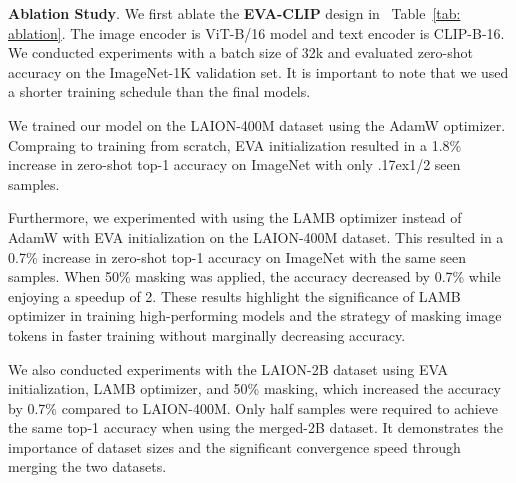 \documentclass[10pt,twocolumn,letterpaper]{article}
\newcommand{\evablue}[1]{\textcolor{00blue!80}{#1}}
\renewcommand{\paragraph}[1]{\vspace{1.25mm}\noindent\textbf{#1}}
\newcommand{\app}{\raise.17ex\hbox{}}
\newcommand{\tblref}[1]{Table~\ref{#1}}
\newcommand{\evaclip}{{\textbf{\evablue{EVA-CLIP}}}\xspace}
\begin{document}
\paragraph{Ablation Study}. We first ablate the \evaclip design in ~\tblref{tab: ablation}. The image encoder is ViT-B/16\cite{vit} model and text encoder is CLIP-B-16. We conducted experiments with a batch size of 32k and evaluated zero-shot accuracy on the ImageNet-1K validation set. It is important to note that we used a shorter training schedule than the final models.

We trained our model on the LAION-400M\cite{laion400m} dataset using the AdamW\cite{Loshchilov2019adamw} optimizer. Compraing to training from scratch, EVA initialization resulted in a 1.8\% increase in zero-shot top-1 accuracy on ImageNet with only \app1/2 seen samples.

Furthermore, we experimented with using the LAMB optimizer instead of AdamW with EVA initialization on the LAION-400M dataset. This resulted in a 0.7\% increase in zero-shot top-1 accuracy on ImageNet with the same seen samples. When 50\% masking was applied, the accuracy decreased by 0.7\% while enjoying a speedup of 2. These results highlight the significance of LAMB optimizer in training high-performing models and the strategy of masking image tokens in faster training without marginally decreasing accuracy.

 We also conducted experiments with the LAION-2B dataset using EVA initialization, LAMB optimizer, and 50\% masking, which increased the accuracy by 0.7\% compared to LAION-400M. Only half samples were required to achieve the same top-1 accuracy when using the merged-2B dataset. It demonstrates the importance of dataset sizes and the significant convergence speed through merging the two datasets.
\end{document}
